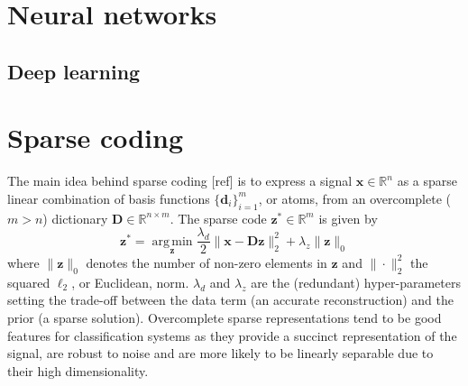 \documentclass[a4paper,12pt,twoside]{report}
\newcommand{\R}{\mathbb{R}}
\DeclareMathOperator*{\argminop}{arg\,min}
\newcommand{\argmin}[1]{\argminop\limits_{#1}}
\newcommand{\normT}[1]{\| #1 \|_2^2}
\newcommand{\normZ}[1]{\| #1 \|_0}
\newcommand{\D}{\mathbf{D}}
\renewcommand{\d}{\mathbf{d}}
\newcommand{\x}{\mathbf{x}}
\newcommand{\z}{\mathbf{z}}
\newcommand{\set}[2]{\{#1_i\}_{i=1}^#2}
\begin{document}
\section{Neural networks}

\subsection{Deep learning}

\section{Sparse coding} \label{sparse_coding}

The main idea behind sparse coding {\color{red} [ref]} is to express a signal $\x \in \R^n$ as a sparse linear combination of basis functions $\set{\d}{m}$, or atoms, from an overcomplete ($m>n$) dictionary $\D \in \R^{n \times m}$. The sparse code $\z^* \in \R^m$ is given by
\begin{equation}\label{eqn:sparsecoding}
	\z^* = \argmin{\z} \frac{\lambda_d}{2} \normT{\x - \D \z} + \lambda_z \normZ{\z}
\end{equation}
where $\normZ{\z}$ denotes the number of non-zero elements in $\z$ and $\normT{\cdot}$ the squared $\ell_2$, or Euclidean, norm. $\lambda_d$ and $\lambda_z$ are the (redundant) hyper-parameters setting the trade-off between the data term (an accurate reconstruction) and the prior (a sparse solution). Overcomplete sparse representations tend to be good features for classification systems as they provide a succinct representation of the signal, are robust to noise and are more likely to be linearly separable due to their high dimensionality.
\end{document}
